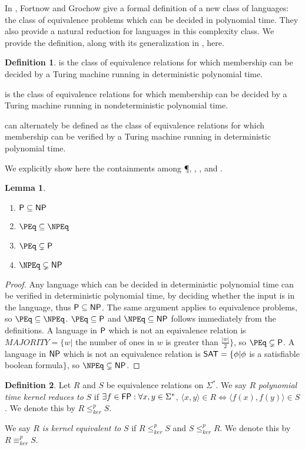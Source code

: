 \documentclass{article}
\newtheorem{lemma}[lemma]{Lemma}
\theoremstyle{definition} \newtheorem{definition}[definition]{Definition}
\newcommand{\sigmastar}{\Sigma^{*}} %
\newcommand{\kr}{\leq^{p}_{ker}} %
\newcommand{\kequiv}{\equiv^{p}_{ker}} %
\newcommand{\defn}[1]{\emph{#1}} %
\newcommand{\pair}[2]{\langle#1,#2\rangle} %
\begin{document}
In \cite{fg09}, Fortnow and Grochow give a formal definition of a new class of
languages: the class of equivalence problems which can be decided in polynomial
time. They also provide a natural reduction for languages in this complexity
class. We provide the definition, along with its generalization in \NP, here.

\begin{definition}\label{def:peq}
  \defn{\PEq} is the class of equivalence relations for which membership can be
  decided by a Turing machine running in deterministic polynomial time.

  \defn{\NPEq} is the class of equivalence relations for which membership can
  be decided by a Turing machine running in nondeterministic polynomial time.

  \defn{\NPEq} can alternately be defined as the class of equivalence relations
  for which membership can be verified by a Turing machine running in
  deterministic polynomial time.
\end{definition}

We explicitly show here the containments among \P, \NP, \PEq, and \NPEq.
\begin{lemma}
  \mbox{} %
  \begin{enumerate}
    \renewcommand{\labelenumi}{\roman{enumi}.}
  \item $\P\subseteq\NP$
  \item $\PEq\subseteq\NPEq$
  \item $\PEq\subsetneq\P$
  \item $\NPEq\subsetneq\NP$
  \end{enumerate}
\end{lemma}
\begin{proof}
  Any language which can be decided in deterministic polynomial time can be
  verified in deterministic polynomial time, by deciding whether the input is
  in the language, thus $\P\subseteq\NP$. The same argument applies to
  equivalence problems, so $\PEq\subseteq\NPEq$.  $\PEq\subseteq\P$ and
  $\NPEq\subseteq\NP$ follows immediately from the definitions. A language in
  $\P$ which is not an equivalence relation is $MAJORITY=\{w|$ the number of
  ones in $w$ is greater than $\frac{|w|}{2}\}$, so $\PEq\subsetneq\P$. A
  language in $\NP$ which is not an equivalence relation is $\SAT=\{\phi|\phi$
  is a satisfiable boolean formula$\}$, so $\NPEq\subsetneq\NP$.
\end{proof}

\begin{definition}\label{def:kr}
  Let $R$ and $S$ be equivalence relations on $\sigmastar$. We say $R$
  \defn{polynomial time kernel reduces to} $S$ if $\exists f\in\FP:\forall
  x,y\in\sigmastar$, $\pair{x}{y}\in R \iff \pair{f(x)}{f(y)}\in S$. We denote
  this by $R\kr S$.
  
  We say $R$ \defn{is kernel equivalent to} $S$ if $R\kr S$ and $S\kr R$. We
  denote this by $R\kequiv S$.
\end{definition}
\end{document}
